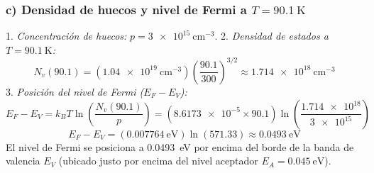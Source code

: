 \begin{problema}
\subsubsection*{c) Densidad de huecos y nivel de Fermi a $T = \SI{90.1}{\kelvin}$}

1. \textit{Concentración de huecos:} $p = \SI{3e15}{\cm^{-3}}$.
2. \textit{Densidad de estados a $T = \SI{90.1}{\kelvin}$:}
\[
N_v(90.1) = (\SI{1.04e19}{\cm^{-3}}) \left( \frac{90.1}{300} \right)^{3/2} \approx \SI{1.714e18}{\cm^{-3}}
\]
3. \textit{Posición del nivel de Fermi ($E_F - E_V$):}
\[
E_F - E_V = k_B T \ln\left( \frac{N_v(90.1)}{p} \right) = (\num{8.6173e-5} \times 90.1) \ln\left( \frac{\num{1.714e18}}{\num{3e15}} \right)
\]
\[
E_F - E_V = (\SI{0.007764}{\eV}) \ln(571.33) \approx \SI{0.0493}{\eV}
\]
El nivel de Fermi se posiciona a \SI{0.0493}{\eV} por encima del borde de la banda de valencia $E_V$ (ubicado justo por encima del nivel aceptador $E_A = \SI{0.045}{\eV}$).
\end{problema}

